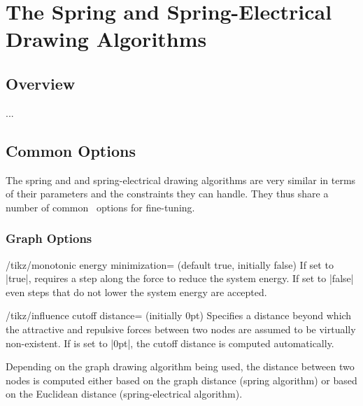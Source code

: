 \section{The Spring and Spring-Electrical Drawing Algorithms}

\subsection{Overview}


...

\subsection{Common Options}

The spring and and spring-electrical drawing algorithms are very similar
in terms of their parameters and the constraints they can handle. They
thus share a number of common \tikzname\ options for fine-tuning.

\subsubsection{Graph Options}

\begin{key}{/tikz/monotonic energy minimization= 
  (default true, initially false)}
  If set to |true|, requires a step along the force to reduce the
  system energy. If set to |false| even steps that do not lower the 
  system energy are accepted.
  \begin{codeexample}[]
  \end{codeexample}
\end{key}

\begin{key}{/tikz/influence cutoff distance= (initially
  0pt)}
  Specifies a distance beyond which the attractive and repulsive forces 
  between two nodes are assumed to be virtually non-existent. If 
   is set to |0pt|, the cutoff distance is computed 
  automatically.

  Depending on the graph drawing algorithm being used, the distance
  between two nodes is computed either based on the graph distance
  (spring algorithm) or based on the Euclidean distance
  (spring-electrical algorithm).
  \begin{codeexample}[]
  \end{codeexample}
\end{key}

